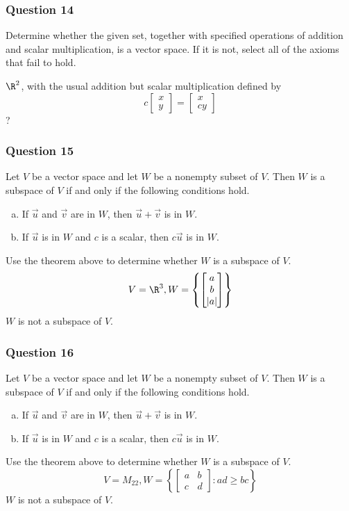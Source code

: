 \documentclass{math}
\begin{document}
\subsubsection*{Question 14}
Determine whether the given set, together with specified operations of addition
and scalar multiplication, is a vector space. If it is not, select all of the
axioms that fail to hold. \par
\( \R^2 \), with the usual addition but scalar multiplication defined by
\[ c\begin{bmatrix}x \\ y\end{bmatrix} = \begin{bmatrix}x \\ cy\end{bmatrix} \]
?

\subsubsection*{Question 15}
Let \( V \) be a vector space and let \( W \) be a nonempty subset of \( V \).
Then \( W \) is a subspace of \( V \) if and only if the following conditions
hold.
\begin{enumerate}[(a)]
  \item If \( \vec{u} \) and \( \vec{v} \) are in \( W \), then \( \vec{u}+
    \vec{v} \) is in \( W \).
  \item If \( \vec{u} \) is in \( W \) and \( c \) is a scalar, then
    \( c\vec{u} \) is in \( W \).
\end{enumerate}
Use the theorem above to determine whether \( W \) is a subspace of \( V \).
\[ V = \R^3, W = \left\{\begin{bmatrix}a \\ b \\ |a|\end{bmatrix}\right\} \]
\( W \) is not a subspace of \( V \).

\subsubsection*{Question 16}
Let \( V \) be a vector space and let \( W \) be a nonempty subset of \( V \).
Then \( W \) is a subspace of \( V \) if and only if the following conditions
hold.
\begin{enumerate}[(a)]
  \item If \( \vec{u} \) and \( \vec{v} \) are in \( W \), then \( \vec{u}+
    \vec{v} \) is in \( W \).
  \item If \( \vec{u} \) is in \( W \) and \( c \) is a scalar, then
    \( c\vec{u} \) is in \( W \).
\end{enumerate}
Use the theorem above to determine whether \( W \) is a subspace of \( V \).
\[ V = M_{22}, W = \left\{\begin{bmatrix}a & b \\ c & d\end{bmatrix}: ad\ge bc
  \right\} \]
\( W \) is not a subspace of \( V \).
\end{document}
